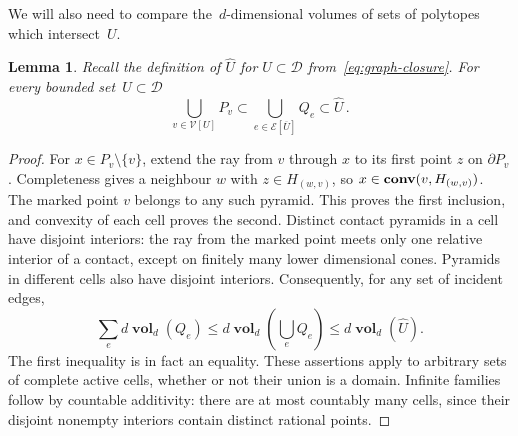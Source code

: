 \documentclass[12pt]{amsart}
\numberwithin{equation}{section}
\DeclareMathOperator{\diam}{{\mathop{diam}}}
\DeclareMathOperator{\conv}{\mathop{\bf conv}}
\newtheorem{lemma}[theorem]{Lemma}
\newcommand*{\Rd}{\ensuremath{\mathbb{R}^d}}
\newcommand{\V}{\mathcal{V}}
\newcommand{\E}{\mathcal{E}}
\newcommand{\GCU}{\hyperref[eq:graph-closure]{\widehat{U}}}
\newcommand{\Qe}{\hyperref[eq:qeset]{Q_e}}
\DeclareMathOperator{\vol}{\mathbf{vol}}
\begin{document}
We will also need to compare the~$d$-dimensional volumes of sets of polytopes which intersect~$U$.
\begin{lemma} \label{lemma:easy-global-qe-bounds}
	 Recall the definition of $\GCU$ for $U\subset \mathcal{D}$ from~\eqref{eq:graph-closure}. For every bounded set~$U \subset \mathcal{D}$
	\begin{equation}
		\label{eq:easy-bounds-geometric-sets}
	   \bigcup_{v\in\V[U]}P_v \subset \bigcup_{e \in \E[\overline{U}]} \Qe \subset \GCU \, . 
\end{equation}
\end{lemma}

\begin{proof}
	
	
For $x\in P_v\setminus\{v\}$, extend the ray from $v$ through $x$ to its first point $z$ on $\partial P_v$. Completeness gives a neighbour $w$ with $z\in H_{(w,v)}$, so $x\in\conv(v,H_{(w,v)})$. The marked point $v$ belongs to any such pyramid. This proves the first inclusion, and convexity of each cell proves the second. Distinct contact pyramids in a cell have disjoint interiors: the ray from the marked point meets only one relative interior of a contact, except on finitely many lower dimensional cones. Pyramids in different cells also have disjoint interiors. Consequently, for any set of incident edges,
\[
 \sum_e d\vol_d(Q_e)\leq d\vol_d\left(\bigcup_e Q_e\right)\leq d\vol_d(\widehat U).
\]
The first inequality is in fact an equality. These assertions apply to arbitrary sets of complete active cells, whether or not their union is a domain. Infinite families follow by countable additivity: there are at most countably many cells, since their disjoint nonempty interiors contain distinct rational points. 
\end{proof}
\end{document}
